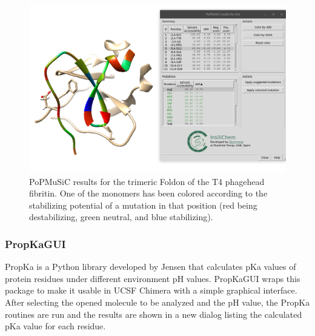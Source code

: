 \begin{figure} %
	\begin{Center}
		\includegraphics[width=\textwidth]{./figures/05/tangram_popmusic.png}
	\end{Center}
	\cprotect\caption[Tangram PoPMuSiC GUI]{PoPMuSiC results for the trimeric Foldon of the T4 phagehead fibritin.\cite{1rfo} One of the monomers has been colored according to the stabilizing potential of a mutation in that position (red being destabilizing, green neutral, and blue stabilizing).}
	\label{fig:tangram-popmusic}
\end{figure}


\subsubsection{PropKaGUI}
PropKa is a Python library developed by Jensen\cite{propka}  that calculates pKa values of protein residues under different environment pH values. PropKaGUI wraps this package to make it usable in UCSF Chimera with a simple graphical interface. After selecting the opened molecule to be analyzed and the pH value, the PropKa routines are run and the results are shown in a new dialog listing the calculated pKa value for each residue. 

